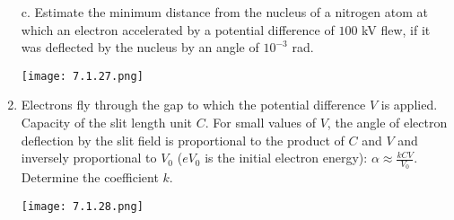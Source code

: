 \documentclass{article}
\begin{document}
\begin{enumerate}[label=7.1.\arabic*]
c. Estimate the minimum distance from the nucleus of a nitrogen atom at which an electron accelerated by a potential difference of $100$ kV flew, if it was deflected by the nucleus by an angle of $10^{-3}$ rad.

\begin{center}
    \texttt{[image: 7.1.27.png]}
\end{center}

\item Electrons fly through the gap to which the potential difference $V$ is applied. Capacity of the slit length unit $C$. For small values of $V$, the angle of electron deflection by the slit field is proportional to the product of $C$ and $V$ and inversely proportional to $V_0$ ($eV_0$ is the initial electron energy): $\alpha \approx \frac{kCV}{V_0}$. Determine the coefficient $k$.

\begin{center}
    \texttt{[image: 7.1.28.png]}
\end{center}


\end{enumerate}
\end{document}
